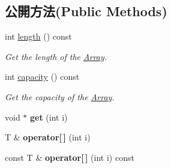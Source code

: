 \subsection*{公開方法(Public Methods)}
\begin{DoxyCompactItemize}
\item 
int \hyperlink{class_magnum_1_1_array_a339bb755d42e2978993447d70779ed04}{length} () const 
\begin{DoxyCompactList}\small\item\em Get the length of the \hyperlink{class_magnum_1_1_array}{Array}. \end{DoxyCompactList}\item 
int \hyperlink{class_magnum_1_1_array_a35912ed31a82aa8c67173988a325b0d0}{capacity} () const 
\begin{DoxyCompactList}\small\item\em Get the capacity of the \hyperlink{class_magnum_1_1_array}{Array}. \end{DoxyCompactList}\item 
void $\ast$ {\bfseries get} (int i)\hypertarget{class_magnum_1_1_array_ac6abfec70dbed68cb43e1ddce217adb3}{}\label{class_magnum_1_1_array_ac6abfec70dbed68cb43e1ddce217adb3}

\item 
T \& {\bfseries operator\mbox{[}$\,$\mbox{]}} (int i)\hypertarget{class_magnum_1_1_array_ac65ba513a2f2e754e9a735337a97514f}{}\label{class_magnum_1_1_array_ac65ba513a2f2e754e9a735337a97514f}

\item 
const T \& {\bfseries operator\mbox{[}$\,$\mbox{]}} (int i) const \hypertarget{class_magnum_1_1_array_aebd649285fc2333239d387d3cd475d82}{}\label{class_magnum_1_1_array_aebd649285fc2333239d387d3cd475d82}


\end{DoxyCompactItemize}
